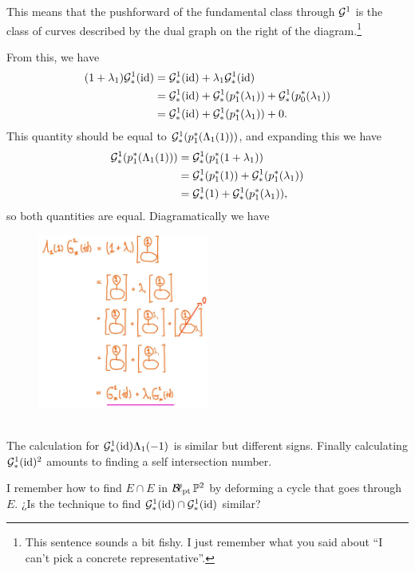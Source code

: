 \documentclass[12pt]{memoir}
\begin{document}
\begin{Ex}
\begin{figure}[h]
    \end{figure}
    This means that the pushforward of the fundamental class through $\mathcal{G}^1$ is the class of curves described by the dual graph on the right of the diagram.\footnote{This sentence sounds a bit fishy. I just remember what you said about ``I can't pick a concrete representative''.}\par
    From this, we have 
    \begin{align*}
        (1+\lambda_1)\mathcal{G}_\ast^1(\operatorname{id})&=\mathcal{G}_\ast^1(\operatorname{id})+\lambda_1\mathcal{G}_\ast^1(\operatorname{id})\\
        &=\mathcal{G}_\ast^1(\operatorname{id})+\mathcal{G}_\ast^1(p_1^\ast(\lambda_1))+\mathcal{G}_\ast^1(p_0^\ast(\lambda_1))\\
        &=\mathcal{G}_\ast^1(\operatorname{id})+\mathcal{G}_\ast^1(p_1^\ast(\lambda_1))+0.
    \end{align*}
    This quantity should be equal to $\mathcal{G}^1_\ast(p_1^\ast(\Lambda_1(1)))$, and expanding this we have
    \begin{align*}
        \mathcal{G}^1_\ast(p_1^\ast(\Lambda_1(1)))&=\mathcal{G}^1_\ast(p_1^\ast(1+\lambda_1))\\
        &=\mathcal{G}^1_\ast(p_1^\ast(1))+\mathcal{G}^1_\ast(p_1^\ast(\lambda_1))\\
        &=\mathcal{G}^1_\ast(1)+\mathcal{G}^1_\ast(p_1^\ast(\lambda_1)),
    \end{align*}
    so both quantities are equal.\newpage
    Diagramatically we have 
    \begin{figure}[h]
        \centering
        \includegraphics[width=0.5\textwidth, clip]{figs/DiagramGenus1TotChernG1PB}
    \end{figure}\\
    The calculation for $\mathcal{G}^1_\ast(\operatorname{id})\Lambda_1(-1)$ is similar but different signs. Finally calculating $\mathcal{G}_\ast^1(\operatorname{id})^2$ amounts to finding a self intersection number.  
\end{Ex}

\begin{Qn}
    I remember how to find $E\cap E$ in $\operatorname{\mathcal{B}\!\ell}_{\text{pt}}\mathbb{P}^2$ by deforming a cycle that goes through $E$. ¿Is the technique to find $\mathcal{G}_\ast^1(\operatorname{id})\cap \mathcal{G}_\ast^1(\operatorname{id})$ similar?
\end{Qn}
\end{document}
